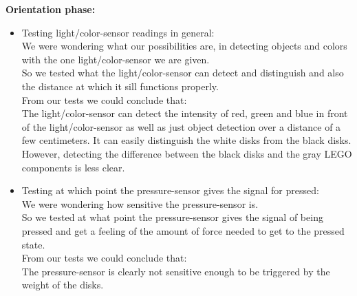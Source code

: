 \textbf{Orientation phase:}
\begin{itemize}

\begin{comment}
\begin{itemize}
	\item Testing light/color-sensor reading in general.
	\item Testing at which point the pressure-sensor gives the signal for pressed.
\end{itemize}
\end{comment}


\item Testing light/color-sensor readings in general:\\
We were wondering what our possibilities are, in detecting objects and colors with the one light/color-sensor we are given.\\
So we tested what the light/color-sensor can detect and distinguish and also the distance at which it sill functions properly.\\
From our tests we could conclude that:\\
The light/color-sensor can detect the intensity of red, green and blue in front of the light/color-sensor as well as just object detection over a distance of a few centimeters. It can easily distinguish the white disks from the black disks. However, detecting the difference between the black disks and the gray LEGO components is less clear.\\


\item Testing at which point the pressure-sensor gives the signal for pressed:\\
We were wondering how sensitive the pressure-sensor is.\\
So we tested at what point the pressure-sensor gives the signal of being pressed and get a feeling of the amount of force needed to get to the pressed state.\\
From our tests we could conclude that:\\
The pressure-sensor is clearly not sensitive enough to be triggered by the weight of the disks.\\

\end{itemize}

